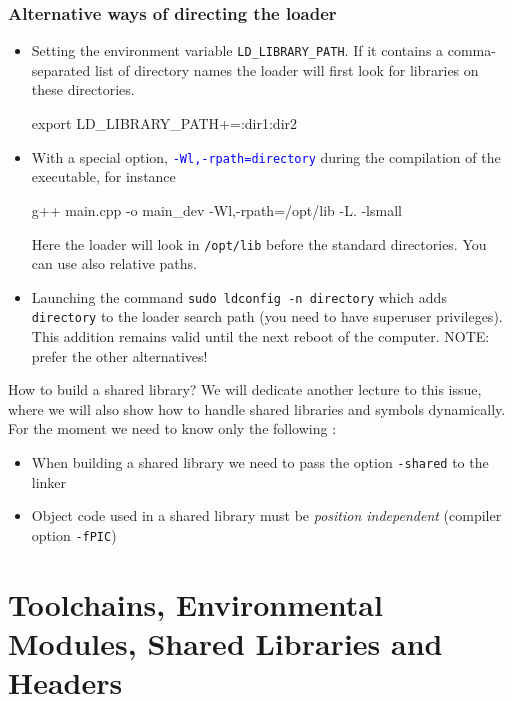 \documentclass[9pt]{beamer}
\begin{document}
\begin{frame}
\frametitle{Alternative ways of directing the loader}
\begin{itemize}
\item Setting the environment variable \texttt{LD\_LIBRARY\_PATH}. If
  it contains a comma-separated list of directory names the
  loader will first look for libraries on these directories.
  \begin{semiverbatim}
    export LD\_LIBRARY\_PATH+=:\alert{dir1}:\alert{dir2}
  \end{semiverbatim}
  \item With a special option, \textcolor{blue}{\texttt{-Wl,-rpath=\alert{directory}}}
 during the compilation of the executable, for instance
   \begin{semiverbatim}
     g++ main.cpp -o main\_dev -Wl,-rpath=/opt/lib  -L. -lsmall
  \end{semiverbatim}
 Here the loader will look in \texttt{/opt/lib} before the standard directories. You can use also relative paths.
\item Launching the command \texttt{sudo ldconfig -n \alert{directory}} which adds \texttt{directory} to the loader search path (you need to have superuser privileges). This addition remains valid until the next reboot of the computer. \alert{NOTE: prefer the other alternatives!}

\end{itemize}
\end{frame}
\begin{frame}{How to build a shared library?}
  We will dedicate another lecture to this issue, where we will also show how to handle shared libraries and symbols dynamically.
  For the moment we need to know only the following :
  \begin{itemize}
  \item When building a shared library we need to pass the option \texttt{-shared} to the linker
  \item Object code used in a shared library must be \emph{position independent} (compiler option \texttt{-fPIC})
    \end{itemize}
\end{frame}

\section{Toolchains, Environmental Modules, Shared Libraries and Headers}
\end{document}
